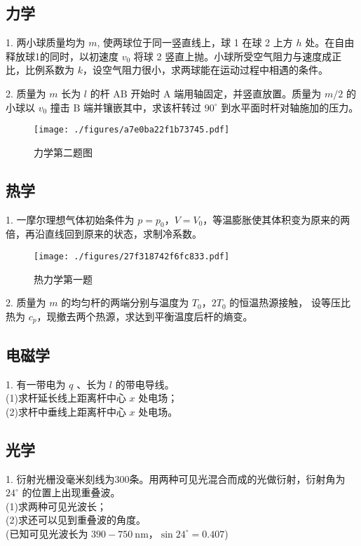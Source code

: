 \subsection{力学}
1. 两小球质量均为 $m$, 使两球位于同一竖直线上，球 1 在球 2 上方 $h$ 处。在自由释放球1的同时，以初速度 $v_{0}$ 将球 2 竖直上抛。小球所受空气阻力与速度成正比，比例系数为 $k$，设空气阻力很小，求两球能在运动过程中相遇的条件。

2. 质量为 $m$ 长为 $l$ 的杆 $\mathrm{AB}$ 开始时 $\mathrm{A}$ 端用轴固定，并竖直放置。质量为 $m / 2$ 的小球以 $v_{0}$ 撞击 $\mathrm{B}$ 端并镶嵌其中，求该杆转过 $90^{\circ}$ 到水平面时杆对轴施加的压力。
\begin{figure}[ht]
\centering
\texttt{[image: ./figures/a7e0ba22f1b73745.pdf]}
\caption{力学第二题图} \label{fig_NJU19_1}
\end{figure}
\subsection{热学}
1. 一摩尔理想气体初始条件为 $p=p_{0}$，$V=V_{0}$，等温膨胀使其体积变为原来的两倍，再沿直线回到原来的状态，求制冷系数。
\begin{figure}[ht]
\centering
\texttt{[image: ./figures/27f318742f6fc833.pdf]}
\caption{热力学第一题} \label{fig_NJU19_2}
\end{figure}
2. 质量为 $m$ 的均匀杆的两端分别与温度为 $T_{0}$，$2T_{0}$ 的恒温热源接触， 设等压比热为 $c_{p}$，现撤去两个热源，求达到平衡温度后杆的熵变。
\subsection{电磁学}
1. 有一带电为 $q$ 、长为 $l$ 的带电导线。\\
(1)求杆延长线上距离杆中心 $x$ 处电场；\\
(2)求杆中垂线上距离杆中心 $x$ 处电场。
\subsection{光学}
1. 衍射光栅没毫米刻线为300条。用两种可见光混合而成的光做衍射，衍射角为 $24^{\circ}$ 的位置上出现重叠波。\\
(1)求两种可见光波长；\\
(2)求还可以见到重叠波的角度。\\
(已知可见光波长为 $390-750 \mathrm{~nm}$，$\sin 24^{\circ}=0.407$)

